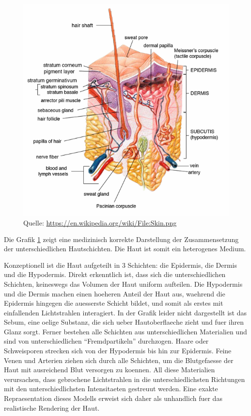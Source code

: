 \documentclass[ngerman,runningheads,a4paper]{llncs}[2018/03/10]
\begin{document}
\begin{figure}[!h]
  \centering
  \includegraphics[scale=0.275,keepaspectratio]{./images/skin-layers-medical.png}
  \caption{Quelle: \url{https://en.wikipedia.org/wiki/File:Skin.png}}
  \label{fig:real-skin-layers}
\end{figure}

Die Grafik \ref{fig:real-skin-layers} zeigt eine medizinisch korrekte Darstellung der Zusammensetzung der unterschiedlichen Hautschichten. Die Haut ist somit ein heterogenes Medium.

Konzeptionell ist die Haut aufgeteilt in 3 Schichten: die Epidermis, die Dermis und die Hypodermis.
Direkt erkenntlich ist, dass sich die unterschiedlichen Schichten, keineswegs das Volumen der Haut uniform aufteilen.
Die Hypodermis und die Dermis machen einen hoeheren Anteil der Haut aus, waehrend die Epidermis hingegen die auesserste Schicht bildet, und somit als erstes mit einfallenden Lichtstrahlen interagiert.
In der Grafik leider nicht dargestellt ist das Sebum, eine oelige Substanz, die sich ueber Hautoberflaeche zieht und fuer ihren Glanz sorgt.
Ferner bestehen alle Schichten aus unterschiedlichen Materialien und sind von unterschiedlichen \enquote{Fremdpartikeln} durchzogen.
Haare oder Schweisporen strecken sich von der Hypodermis bis hin zur Epidermis.
Feine Venen und Arterien ziehen sich durch alle Schichten, um die Blutgefaesse der Haut mit ausreichend Blut versorgen zu koennen.
All diese Materialien verursachen, dass gebrochene Lichtstrahlen in die unterschiedlichsten Richtungen mit den unterschiedlichsten Intensitaeten gestreuut werden.
Eine exakte Repraesentation dieses Modells erweist sich daher als unhandlich fuer das realistische Rendering der Haut.
\end{document}

